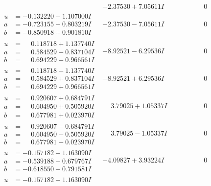 \documentclass[1p]{elsarticle_modified}
\theoremstyle{definition}
\begin{document}
$$\begin{array}{c|c|c}
 & -2.37530 + 7.05611 I & \phantom{-0.000000 } 0 \\ \hline\begin{aligned}
u &= -0.132220 - 1.107000 I \\
a &= -0.723155 + 0.803219 I \\
b &= -0.850918 + 0.901810 I\end{aligned}
 & -2.37530 - 7.05611 I & \phantom{-0.000000 } 0 \\ \hline\begin{aligned}
u &= \phantom{-}0.118718 + 1.137740 I \\
a &= \phantom{-}0.584529 - 0.837104 I \\
b &= \phantom{-}0.694229 - 0.966561 I\end{aligned}
 & -8.92521 - 6.29536 I & \phantom{-0.000000 } 0 \\ \hline\begin{aligned}
u &= \phantom{-}0.118718 - 1.137740 I \\
a &= \phantom{-}0.584529 + 0.837104 I \\
b &= \phantom{-}0.694229 + 0.966561 I\end{aligned}
 & -8.92521 + 6.29536 I & \phantom{-0.000000 } 0 \\ \hline\begin{aligned}
u &= \phantom{-}0.920607 + 0.684791 I \\
a &= \phantom{-}0.604950 + 0.505920 I \\
b &= \phantom{-}0.677981 + 0.023970 I\end{aligned}
 & \phantom{-}3.79025 + 1.05337 I & \phantom{-0.000000 } 0 \\ \hline\begin{aligned}
u &= \phantom{-}0.920607 - 0.684791 I \\
a &= \phantom{-}0.604950 - 0.505920 I \\
b &= \phantom{-}0.677981 - 0.023970 I\end{aligned}
 & \phantom{-}3.79025 - 1.05337 I & \phantom{-0.000000 } 0 \\ \hline\begin{aligned}
u &= -0.157182 + 1.163090 I \\
a &= -0.539188 - 0.679767 I \\
b &= -0.618550 - 0.791581 I\end{aligned}
 & -4.09827 + 3.93224 I & \phantom{-0.000000 } 0 \\ \hline\begin{aligned}
u &= -0.157182 - 1.163090 I \\

\end{aligned}
\end{array}$$
\end{document}
